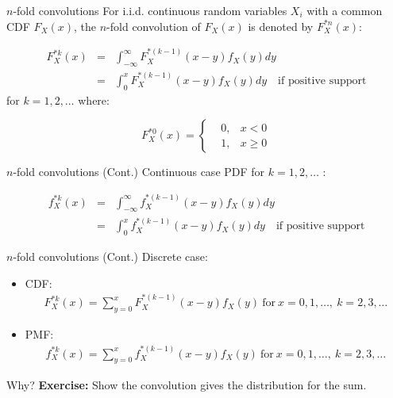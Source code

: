 \documentclass[11pt]{beamer}
\begin{document}
\begin{frame}{$n$-fold convolutions}
  For i.i.d. continuous random variables $X_i$ with a common CDF $F_X (x)$, the $n$-fold convolution of $F_X (x)$ is denoted by $F^{*n}_X (x)$: 
  
\begin{eqnarray*}
    F^{*k}_{X}\left( x\right) &=& \int^{\infty}_{-\infty} F^{*(k-1)}_{X} \left(x-y\right) f_X (y) d y\\
    &=& \int^{x}_{0} F^{*(k-1)}_{X} \left(x-y\right) f_X (y) d y \quad \mbox{if positive support}
    \end{eqnarray*}
     for $k = 1, 2, \ldots$ where:  
     
 
 
  $$F^{*0}_{X}\left( x\right) =
    \left\{
    \begin{aligned}
    & 0 , & x < 0 \\
    & 1 , & x \geq 0
    \end{aligned}
    \right.$$
  
\end{frame}
\begin{frame}{$n$-fold convolutions (Cont.)}
Continuous case PDF for $k = 1, 2, \ldots$ :
 
\begin{eqnarray*}
    f^{*k}_{X}\left( x\right) &=& \int^{\infty}_{-\infty} f^{*(k-1)}_{X} \left(x-y\right) f_X (y) d y\\
    &=& \int^{x}_{0} f^{*(k-1)}_{X} \left(x-y\right) f_X (y) d y \quad \mbox{if positive support}
    \end{eqnarray*}
    
 
\end{frame}
\begin{frame}{$n$-fold convolutions (Cont.)}
Discrete case:
      \begin{itemize}
    \item CDF:
    \begin{eqnarray*}
    F^{*k}_{X}\left( x\right) = \sum^{x}_{y = 0} F^{*(k-1)}_{X} \left(x-y\right) f_X (y) \ \mbox{for} \ x=0,1,\ldots, \ k = 2, 3, \ldots
    \end{eqnarray*}
    \item PMF:
    \begin{eqnarray*}
    f^{*k}_{X}\left( x\right) = \sum^{x}_{y = 0} f^{*(k-1)}_{X} \left(x-y\right) f_X (y) \ \mbox{for} \ x=0,1,\ldots, \ k = 2, 3, \ldots
    \end{eqnarray*}
  \end{itemize}
\end{frame}
\begin{frame}{Why?}
\vspace{-3 cm}
  \textbf{Exercise:} Show the convolution gives the distribution for the sum. 
  
  
\end{frame}
\begin{frame}

\end{frame}
\end{document}
